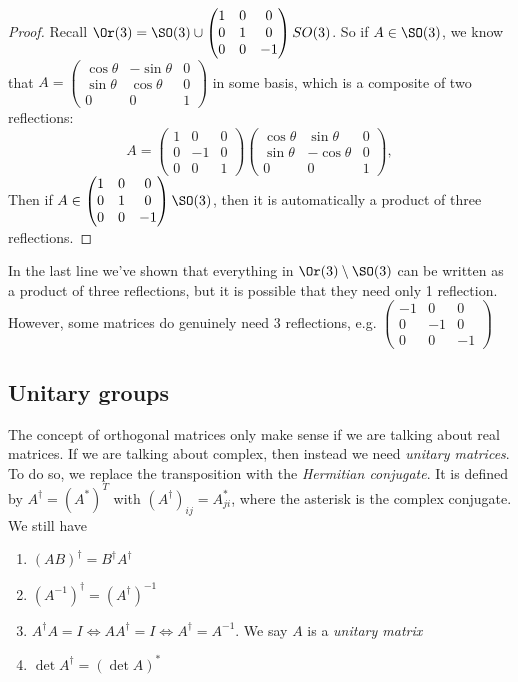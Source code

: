 \documentclass[a4paper]{article}
\begin{document}
\begin{proof}
  Recall $\Or(3) = \SO(3) \cup
  \begin{pmatrix}
    1 & 0 & 0\\
    0 & 1 & 0\\
    0 & 0 & -1
  \end{pmatrix}SO(3)$.
  So if $A\in \SO(3)$, we know that $A =
  \begin{pmatrix}
    \cos\theta & -\sin\theta & 0\\
    \sin\theta & \cos\theta & 0\\
    0 & 0 & 1
  \end{pmatrix}$ in some basis, which is a composite of two reflections:
  \[
    A =
    \begin{pmatrix}
      1 & 0 & 0\\
      0 & -1 & 0\\
      0 & 0 & 1
    \end{pmatrix}
    \begin{pmatrix}
      \cos\theta & \sin\theta & 0\\
      \sin\theta & -\cos\theta & 0\\
      0 & 0 & 1
    \end{pmatrix},
  \]
  Then if $A\in \begin{pmatrix}
    1 & 0 & 0\\
    0 & 1 & 0\\
    0 & 0 & -1
  \end{pmatrix}\SO(3)$, then it is automatically a product of three reflections.
\end{proof}
In the last line we've shown that everything in $\Or(3)\setminus \SO(3)$ can be written as a product of three reflections, but it is possible that they need only 1 reflection. However, some matrices do genuinely need 3 reflections, e.g.
$\begin{pmatrix}
  -1 & 0 & 0\\
  0 & -1 & 0\\
  0 & 0 & -1
\end{pmatrix}$

\subsection{Unitary groups}
The concept of orthogonal matrices only make sense if we are talking about real matrices. If we are talking about complex, then instead we need \emph{unitary matrices}. To do so, we replace the transposition with the \emph{Hermitian conjugate}. It is defined by $A^\dagger = (A^*)^T$ with $(A^\dagger)_{ij} = A_{ji}^*$, where the asterisk is the complex conjugate. We still have
\begin{enumerate}
  \item $(AB)^\dagger = B^\dagger A^\dagger$
  \item $(A^{-1})^\dagger = (A^\dagger)^{-1}$
  \item $A^\dagger A = I \Leftrightarrow AA^\dagger = I \Leftrightarrow A^\dagger = A^{-1}$. We say $A$ is a \emph{unitary matrix}
  \item $\det A^{\dagger} = (\det A)^*$
\end{enumerate}
\end{document}
